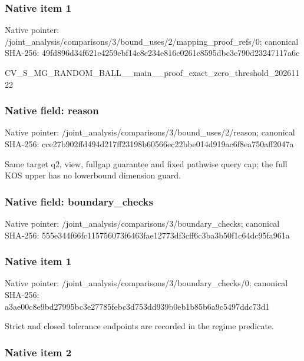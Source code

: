 \documentclass[10pt,a4paper]{article}
\begin{document}
\subsubsection{Native item 1}


Native pointer: /joint\_analysis/comparis\allowbreak{}ons/3/bound\_uses/2/mappi\allowbreak{}ng\_proof\_refs/0; canonical SHA-256: 49fd896d34f621e4259ebf14\allowbreak{}c8c234e816c0261c8595dbc3\allowbreak{}e790d23247117a6c


CV\_S\_MG\_RANDOM\_BALL\_\_mai\allowbreak{}n\_\_proof\_exact\_zero\_thre\allowbreak{}shold\_20261122


\subsubsection{Native field: reason}


Native pointer: /joint\_analysis/comparis\allowbreak{}ons/3/bound\_uses/2/reaso\allowbreak{}n; canonical SHA-256: cce27b902ffd494d217ff231\allowbreak{}98b60566ec22bbe014d919ac\allowbreak{}6f8ea750aff2047a


Same target q2, view, fullgap guarantee and fixed pathwise query cap; the full KOS upper has no lowerbound dimension guard.


\subsubsection{Native field: boundary\_checks}


Native pointer: /joint\_analysis/comparis\allowbreak{}ons/3/boundary\_checks; canonical SHA-256: 555e344f66fc115756073f64\allowbreak{}63fae12773df3cff6c3ba3b5\allowbreak{}0f1c64dc95fa961a



\subsubsection{Native item 1}


Native pointer: /joint\_analysis/comparis\allowbreak{}ons/3/boundary\_checks/0; canonical SHA-256: a3ae00c8e9bd27995bc3e277\allowbreak{}85febc3d753dd939b0eb1b85\allowbreak{}b6a9c5497ddc73d1


Strict and closed tolerance endpoints are recorded in the regime predicate.


\subsubsection{Native item 2}
\end{document}

